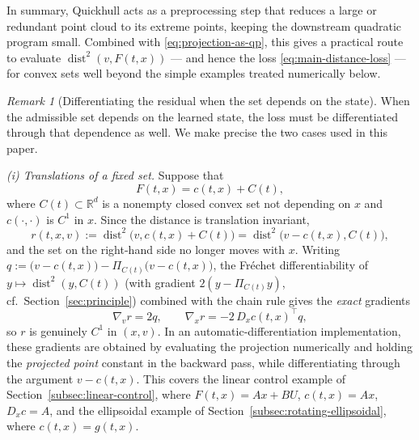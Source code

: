 \documentclass[11pt]{elsarticle}
\theoremstyle{definition}
\theoremstyle{remark}
\newtheorem{remark}[theorem]{Remark}
\numberwithin{equation}{section}
\def\dist{\operatorname{dist}}
\begin{document}
	In summary, Quickhull acts as a preprocessing step that reduces a large
	or redundant point cloud to its extreme points, keeping the downstream
	quadratic program small.  Combined with \eqref{eq:projection-as-qp},
	this gives a practical route to evaluate $\dist^2(v,F(t,x))$ --- and
	hence the loss \eqref{eq:main-distance-loss} --- for convex sets well
	beyond the simple examples treated numerically below.
	
	\begin{remark}[Differentiating the residual when the set depends on the
		state]\label{rem:moving-set-gradient}
		When the admissible set depends on the learned state, the loss must
		be differentiated through that dependence as well. We make precise
		the two cases used in this paper.
		
		\emph{(i) Translations of a fixed set.} Suppose that
		\[
		F(t,x)=c(t,x)+C(t),
		\]
		where $C(t)\subset\mathbb{R}^d$ is a nonempty closed convex set not
		depending on $x$ and $c(\cdot,\cdot)$ is $C^1$ in $x$. Since the
		distance is translation invariant,
		\[
		r(t,x,v):=\dist^2\bigl(v,c(t,x)+C(t)\bigr)
		=\dist^2\bigl(v-c(t,x),C(t)\bigr),
		\]
		and the set on the right-hand side no longer moves with $x$.
		Writing $q:=\bigl(v-c(t,x)\bigr)-\Pi_{C(t)}\bigl(v-c(t,x)\bigr)$,
		the Fr\'echet differentiability of $y\mapsto\dist^2(y,C(t))$ (with
		gradient $2(y-\Pi_{C(t)}y)$, cf.\ Section~\ref{sec:principle})
		combined with the chain rule gives the \emph{exact} gradients
		\[
		\nabla_v r=2q,
		\qquad
		\nabla_x r=-2\,D_xc(t,x)^{\!\top}q,
		\]
		so $r$ is genuinely $C^1$ in $(x,v)$. In an automatic-differentiation
		implementation, these gradients are obtained by evaluating the
		projection numerically and holding the \emph{projected point}
		constant in the backward pass, while differentiating through the
		argument $v-c(t,x)$. This covers the linear control example of
		Section~\ref{subsec:linear-control}, where
		$F(t,x)=Ax+BU$, $c(t,x)=Ax$, $D_xc=A$, and the ellipsoidal example
		of Section~\ref{subsec:rotating-ellipsoidal}, where $c(t,x)=g(t,x)$.
		

\end{remark}
\end{document}

